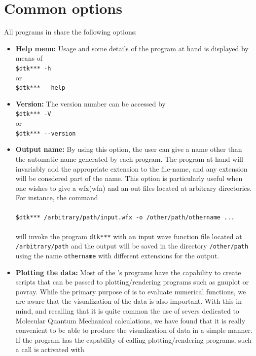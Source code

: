 \section{Common options}\label{sec:commonopts}

All programs in \DTK{} share the following options:

\begin{itemize}
   \item \textbf{Help menu:} Usage and some details of the program at hand is displayed by means of\\
   \phantom{MMM}\texttt{\$dtk*** -h}\\or\\
   \phantom{MMM}\texttt{\$dtk*** {-}-help}
   \item \textbf{Version:} The version number can be accessed by\\
   \phantom{MMM}\texttt{\$dtk*** -V}\\or\\
   \phantom{MMM}\texttt{\$dtk*** {-}-version}
   \item\textbf{Output name:} By using this option, the user can give a name other than the automatic name generated by each program. The program at hand will invariably add the appropriate extension to the file-name, and any extension will be consdered part of the name.
   This option is particularly useful when one wishes to give a wfx(wfn) and an out files located at arbitrary directories. For instance, the command\\\phantom{adf}\\
   \phantom{MMM}\texttt{\$dtk*** /arbitrary/path/input.wfx -o /other/path/othername ...}\\\phantom{adf}\\
   will invoke the program \texttt{dtk***} with an input wave function file located at \texttt{/arbit\-rary\-/path} and the output will be saved in the directory \texttt{/other/path} using the name \texttt{othername} with different extensions for the output.
   \item \textbf{Plotting the data:} Most of the \DTK's programs have the capability to create scripts that can be passed to plotting/rendering programs such as gnuplot or povray. While the primary purpose of \DTK{} is to evaluate numerical functions, we are aware that the visualization of the data is also important. With this in mind, and recalling that it is quite common the use of severs dedicated to Molecular Quantum Mechanical calculations, we have found that it is really convenient to be able to produce the visualization of data in a simple manner. If the program has the capability of calling plotting/rendering programs, such a call is activated with\\

\end{itemize}
